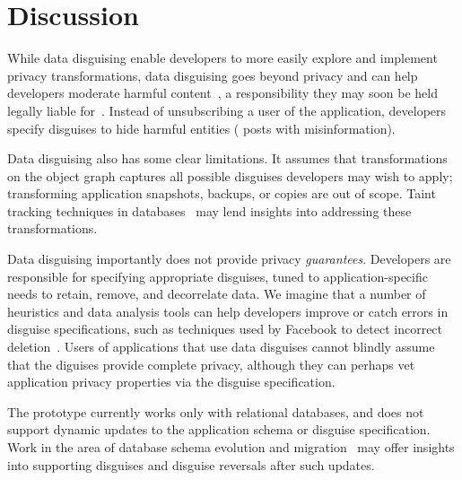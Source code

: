\section{Discussion}
While data disguising enable developers to more easily explore and implement privacy transformations,
data disguising goes beyond privacy and can help developers moderate harmful content~\cite{contentmod,
sasb}, a responsibility they may soon be held legally liable for~\cite{nytimes:230}. Instead of
unsubscribing a user of the application, developers specify disguises to hide harmful entities (\eg
posts with misinformation).

Data disguising also has some clear limitations. It assumes that transformations on the object graph
captures all possible disguises developers may wish to apply; transforming application
snapshots, backups, or copies are out of scope. Taint tracking techniques in
databases~\cite{schengendb} may lend insights into addressing these transformations.

Data disguising importantly does not provide privacy \emph{guarantees}. Developers are responsible for
specifying appropriate disguises, tuned to application-specific needs to retain, remove, and decorrelate
data. 
We imagine that a number of heuristics and data analysis tools can help developers improve or catch
errors in disguise specifications, such as techniques used by Facebook to detect incorrect
deletion~\cite{delf}.  Users of applications that use data disguises cannot blindly assume that the
diguises provide complete privacy, although they can perhaps vet application privacy properties via the
disguise specification.

The \sys prototype currently works only with relational databases, and does not support dynamic
updates to the application schema or disguise specification.
Work in the area of database schema evolution and migration~\cite{schema:evo} may offer insights
into supporting disguises and disguise reversals after such updates.

\iffalse
